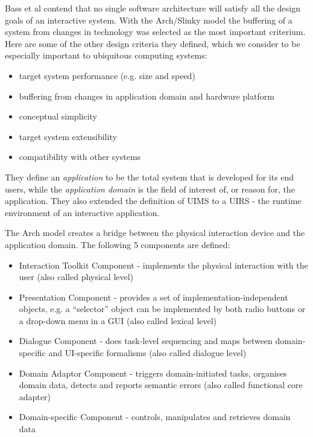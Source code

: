 	Bass et al \cite{Bass1992} contend that no single software architecture will satisfy all the design goals of an interactive system. With the Arch/Slinky model the buffering of a system from changes in technology was selected as the most important criterium. Here are some of the other design criteria they defined, which we consider to be especially important to ubiquitous computing systems:
	
	\begin{itemize}
		\item target system performance (e.g. size and speed)
		\item 	buffering from changes in application domain and hardware platform
		\item 	conceptual simplicity
		\item 	target system extensibility
		\item 	compatibility with other systems
	\end{itemize}
	
	 They define an \emph{application} to be the total system that is developed for its end users, while the \emph{application domain} is the field of interest of, or reason for, the application. They also extended the definition of \ac{UIMS} to a  \ac{UIRS} - the runtime environment of an interactive application.
	
	The Arch model creates a bridge between the physical interaction device and the application domain. The following 5 components are defined:
	
	\begin{itemize}
		\item Interaction Toolkit Component - implements the physical interaction with the user (also called physical level)
		\item Presentation Component - provides a set of implementation-independent objects, e.g. a ``selector'' object can be implemented by both radio buttons or a drop-down menu in a GUI (also called lexical level)
		\item Dialogue Component - does task-level sequencing and maps between domain-specific and UI-specific formalisms (also called dialogue level)
		\item Domain Adaptor Component - triggers domain-initiated tasks, organises domain data, detects and reports semantic errors (also called functional core adapter)
		\item Domain-specific Component - controls, manipulates and retrieves domain data
	\end{itemize}

